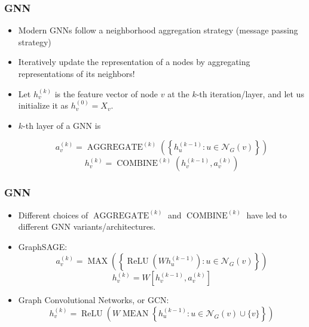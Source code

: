 \documentclass[handout]{beamer}
\DeclareMathOperator{\aggregate}{AGGREGATE}
\DeclareMathOperator{\combine}{COMBINE}
\DeclareMathOperator{\MAX}{MAX}
\DeclareMathOperator{\MEAN}{MEAN}
\DeclareMathOperator{\relu}{ReLU}
\begin{document}
\begin{frame}
\frametitle{GNN}

\begin{itemize}
	\item Modern GNNs follow a \alert{neighborhood aggregation strategy} (message passing strategy) \pause
	
	\item Iteratively update the representation of a nodes by aggregating representations of its neighbors! \pause
	
	\item Let $h_v^{(k)}$ is the feature vector of node $v$ at the $k$-th iteration/layer, and let us initialize it as $h_v^{(0)} = X_v$. \pause
	
	\item $k$-th layer of a GNN is
	
	$$a_v^{(k)} = \aggregate^{(k)} \left( \left\{ h_u^{(k - 1)} : u \in \mathcal{N}_G(v) \right\} \right)$$
	$$h_v^{(k)} = \combine^{(k)} \left( h_v^{(k - 1)}, a_v^{(k)} \right)$$
\end{itemize}

\end{frame}

\begin{frame}
\frametitle{GNN}

\begin{itemize}
	\item Different choices of $\aggregate^{(k)}$ and $\combine^{(k)}$ have led to different GNN variants/architectures. \pause
	
	\item GraphSAGE:
	$$a_v^{(k)} = \MAX \left( \left\{ \relu \left( W h_u^{(k - 1)} \right) : u \in \mathcal{N}_G(v) \right\} \right)$$
	$$h_v^{(k)} = W \left[ h_v^{(k - 1)}, a_v^{(k)} \right]$$ \pause
	
	\item Graph Convolutional Networks, or GCN:
	$$h_v^{(k)} = \relu \left( W \MEAN \left\{ h_u^{(k - 1)} : u \in \mathcal{N}_G(v) \cup \{v\} \right\} \right)$$
\end{itemize}

\end{frame}
\end{document}
